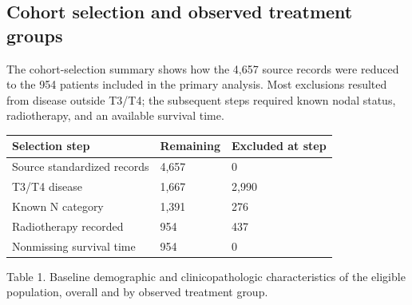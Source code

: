\documentclass[10pt,twocolumn]{article}
\begin{document}
\subsection{Cohort selection and observed treatment groups}
The cohort-selection summary shows how the 4,657 source records were reduced to the 954 patients included in the primary analysis. Most exclusions resulted from disease outside T3/T4; the subsequent steps required known nodal status, radiotherapy, and an available survival time.\par
\begin{table}[t]
\centering
\small
\begin{tabularx}{\columnwidth}{@{}XXX@{}}
\toprule
\textbf{Selection step} & \textbf{Remaining} & \textbf{Excluded at step} \\
\midrule
Source standardized records & 4,657 & 0 \\
T3/T4 disease & 1,667 & 2,990 \\
Known N category & 1,391 & 276 \\
Radiotherapy recorded & 954 & 437 \\
Nonmissing survival time & 954 & 0 \\
\bottomrule
\end{tabularx}
\end{table}
Table 1. Baseline demographic and clinicopathologic characteristics of the eligible population, overall and by observed treatment group.\par
\end{document}
